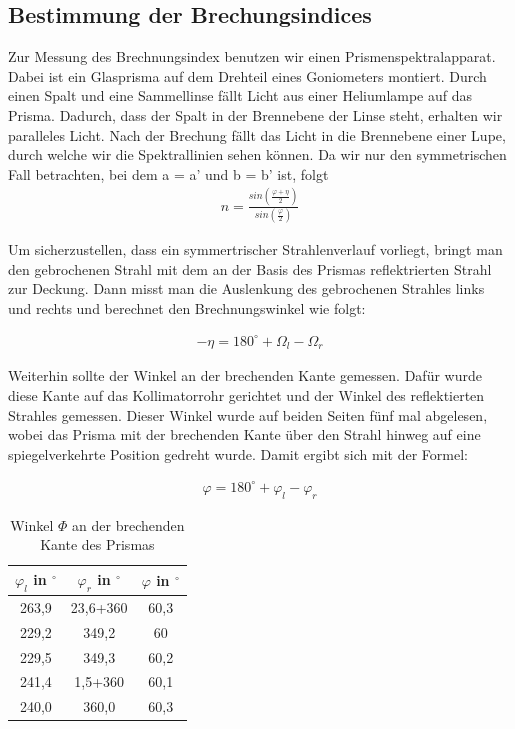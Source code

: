 \subsection{Bestimmung der Brechungsindices}

Zur Messung des Brechnungsindex benutzen wir einen Prismenspektralapparat.
Dabei ist ein Glasprisma auf dem Drehteil eines Goniometers montiert. Durch
einen Spalt und eine Sammellinse fällt Licht aus einer Heliumlampe auf
das Prisma. Dadurch, dass der Spalt in der Brennebene der Linse steht, erhalten
wir paralleles Licht. Nach der Brechung fällt das Licht in die Brennebene einer Lupe, durch welche wir
die Spektrallinien sehen können.
Da wir nur den symmetrischen Fall betrachten, bei dem a = a' und b = b'
ist, folgt
\begin{align}
n=\frac{sin(\frac{\varphi + \eta}{2})}{sin(\frac{\varphi}{2})}\nonumber
\end{align}

Um sicherzustellen, dass ein symmertrischer Strahlenverlauf vorliegt, bringt
man den gebrochenen Strahl mit dem an der Basis des Prismas reflektrierten
Strahl zur Deckung. Dann misst man die Auslenkung des gebrochenen Strahles
links und rechts und berechnet den Brechnungswinkel wie folgt:

\begin{align}
-\eta=180^\circ +\Omega_l - \Omega_r \nonumber
\end{align}

Weiterhin sollte der Winkel an der brechenden Kante gemessen. Dafür wurde
diese Kante auf das Kollimatorrohr gerichtet und der Winkel des reflektierten
Strahles gemessen. Dieser Winkel wurde auf beiden Seiten fünf mal abgelesen,
wobei das Prisma mit der brechenden Kante über den Strahl hinweg auf eine
spiegelverkehrte Position gedreht wurde. Damit ergibt sich mit der Formel:

\begin{align}
\varphi=180^\circ +\varphi_l - \varphi_r \nonumber
\end{align}

\begin{table}[h]
\begin{center}
\begin{tabular}[c]{|c|c|c|} \hline
$\varphi_l$ in $^\circ$ & $\varphi_r$ in $^\circ$ & $\varphi$  in $^\circ$\\ \hline
263,9 & 23,6+360 & 60,3 \\ 
229,2 & 349,2 & 60 \\ 
229,5 & 349,3 & 60,2 \\ 
241,4 & 1,5+360 & 60,1 \\ 
240,0 & 360,0 & 60,3 \\ \hline
\end{tabular}
\caption{Winkel $\Phi$ an der brechenden Kante des Prismas}
\end{center}
\end{table}

